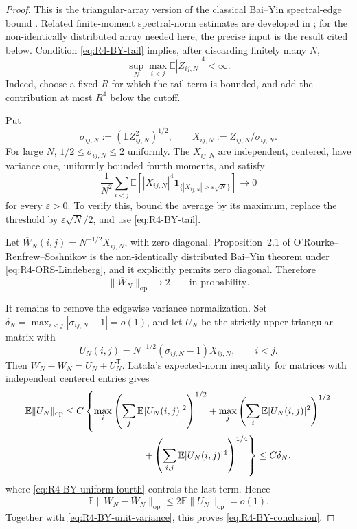 \documentclass[11pt]{article}
\theoremstyle{definition}
\theoremstyle{remark}
\newcommand{\E}{\mathbb E}
\newcommand{\op}{\mathrm{op}}
\newcommand{\one}{\mathbf 1}
\newcommand{\norm}[1]{\lVert #1\rVert}
\begin{document}
\begin{proof}
This is the triangular-array version of the classical Bai--Yin spectral-edge
bound \cite{BaiYin1988}.  Related finite-moment spectral-norm estimates are
developed in \cite{Vu2007SpectralNorm}; for the non-identically distributed
array needed here, the precise input is the result cited below.
Condition \eqref{eq:R4-BY-tail} implies, after discarding finitely many
\(N\),
\begin{equation}\label{eq:R4-BY-uniform-fourth}
 \sup_N\max_{i<j}\E|Z_{ij,N}|^4<\infty.
\end{equation}
Indeed, choose a fixed \(R\) for which the tail term is bounded, and add the
contribution at most \(R^4\) below the cutoff.

Put
\[
 \sigma_{ij,N}:=(\E Z_{ij,N}^2)^{1/2},
 \qquad X_{ij,N}:=Z_{ij,N}/\sigma_{ij,N}.
\]
For large \(N\), \(1/2\le\sigma_{ij,N}\le2\) uniformly.  The
\(X_{ij,N}\) are independent, centered, have variance one, uniformly
bounded fourth moments, and satisfy
\begin{equation}\label{eq:R4-ORS-Lindeberg}
 \frac1{N^2}\sum_{i<j}
 \E\!\left[|X_{ij,N}|^4
 \one_{\{|X_{ij,N}|>\varepsilon\sqrt N\}}\right]
 \longrightarrow0
\end{equation}
for every \(\varepsilon>0\).  To verify this, bound the average by its
maximum, replace the threshold by \(\varepsilon\sqrt N/2\), and use
\eqref{eq:R4-BY-tail}.

Let \(\overline W_N(i,j)=N^{-1/2}X_{ij,N}\), with zero diagonal.
Proposition~2.1 of O'Rourke--Renfrew--Soshnikov
\cite{ORS2013} is the non-identically distributed Bai--Yin theorem under
\eqref{eq:R4-ORS-Lindeberg}, and it explicitly permits zero diagonal.
Therefore
\begin{equation}\label{eq:R4-BY-unit-variance}
 \norm{\overline W_N}_{\op}\longrightarrow2
 \qquad\text{in probability}.
\end{equation}

It remains to remove the edgewise variance normalization.  Set
\(\delta_N=\max_{i<j}|\sigma_{ij,N}-1|=o(1)\), and let \(U_N\) be the
strictly upper-triangular matrix with
\[
 U_N(i,j)=N^{-1/2}(\sigma_{ij,N}-1)X_{ij,N},\qquad i<j.
\]
Then \(W_N-\overline W_N=U_N+U_N^{\mathsf T}\).  Lata\l a's expected-norm
inequality for matrices with independent centered entries \cite{Latala2005}
gives
\begin{align*}
 \E\norm{U_N}_{\op}
 &\le C\left\{
 \max_i\left(\sum_j\E|U_N(i,j)|^2\right)^{1/2}
 +\max_j\left(\sum_i\E|U_N(i,j)|^2\right)^{1/2}\right.\\
 &\hspace{29mm}\left.
 +\left(\sum_{i,j}\E|U_N(i,j)|^4\right)^{1/4}
 \right\}
 \le C\delta_N,
\end{align*}
where \eqref{eq:R4-BY-uniform-fourth} controls the last term.  Hence
\[
 \E\norm{W_N-\overline W_N}_{\op}
 \le2\E\norm{U_N}_{\op}=o(1).
\]
Together with \eqref{eq:R4-BY-unit-variance}, this proves
\eqref{eq:R4-BY-conclusion}.


\end{proof}
\end{document}
